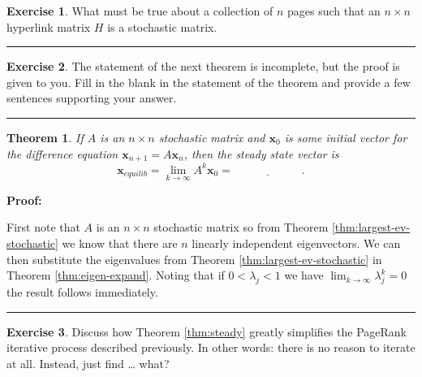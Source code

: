 \documentclass[
]{book}
\newtheorem{theorem}{Theorem}[chapter]
\theoremstyle{definition}
\theoremstyle{definition}
\theoremstyle{definition}
\newtheorem{exercise}{Exercise}[chapter]
\theoremstyle{remark}
\begin{document}
\begin{exercise}
\protect\hypertarget{exr:unnamed-chunk-403}{}{\label{exr:unnamed-chunk-403} }What must be true about a collection of \(n\) pages such that an
\(n\times n\) hyperlink matrix \(H\) is a stochastic matrix.
\end{exercise}

\begin{center}\rule{0.5\linewidth}{0.5pt}\end{center}

\begin{exercise}
\protect\hypertarget{exr:unnamed-chunk-404}{}{\label{exr:unnamed-chunk-404} }The statement of the next theorem is incomplete, but the proof is given
to you. Fill in the blank in the statement of the theorem and provide a
few sentences supporting your answer.
\end{exercise}

\begin{center}\rule{0.5\linewidth}{0.5pt}\end{center}

\begin{theorem}
\protect\hypertarget{thm:steady}{}{\label{thm:steady} }If \(A\) is an
\(n \times n\) stochastic matrix and \(\boldsymbol{x}_0\) is some initial vector for
the difference equation \(\boldsymbol{x}_{n+1} = A \boldsymbol{x}_n\), then the steady state
vector is
\[\boldsymbol{x}_{equilib} = \lim_{k \to\infty} A^k \boldsymbol{x}_0 = \underline{\hspace{1in}}.\]
\end{theorem}

\textbf{Proof:}

First note that \(A\) is an \(n \times n\) stochastic matrix so from Theorem \ref{thm:largest-ev-stochastic} we know that there are \(n\)
linearly independent eigenvectors. We can then substitute the
eigenvalues from Theorem \ref{thm:largest-ev-stochastic} in Theorem \ref{thm:eigen-expand}. Noting that if \(0<\lambda_j<1\) we have
\(\lim_{k \to  \infty} \lambda_j^k = 0\) the result follows immediately.

\begin{center}\rule{0.5\linewidth}{0.5pt}\end{center}

\begin{exercise}
\protect\hypertarget{exr:unnamed-chunk-405}{}{\label{exr:unnamed-chunk-405} }Discuss how Theorem \ref{thm:steady} greatly simplifies the PageRank iterative
process described previously. In other words: there is no reason to
iterate at all. Instead, just find \ldots{} what?
\end{exercise}
\end{document}
